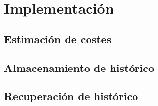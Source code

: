 \chapter{Implementación}

\section{Estimación de costes}

\section{Almacenamiento de histórico}

\section{Recuperación de histórico}
